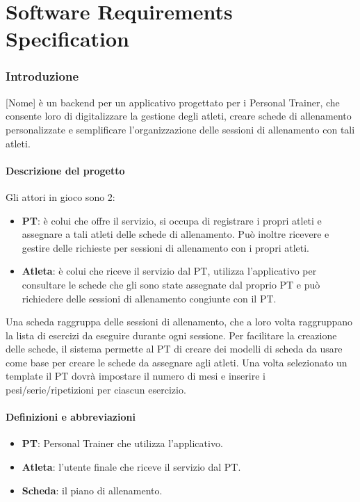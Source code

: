 \part{Software Requirements Specification}

\section{Introduzione}
[Nome] è un backend per un applicativo progettato per i Personal Trainer, che
consente loro di digitalizzare la gestione degli atleti, creare schede
di allenamento personalizzate e semplificare l'organizzazione delle
sessioni di allenamento con tali atleti.

\subsection{Descrizione del progetto}
Gli attori in gioco sono 2:
\begin{itemize}
  \item \textbf{PT}: è colui che offre il servizio, si occupa di
    registrare i propri atleti e assegnare a tali atleti delle schede
    di allenamento. Può inoltre ricevere e gestire delle richieste
    per sessioni di allenamento con i propri atleti.
  \item \textbf{Atleta}: è colui che riceve il servizio dal PT,
    utilizza l'applicativo per consultare le schede che gli sono
    state assegnate dal proprio PT e può richiedere delle sessioni di
    allenamento congiunte con il PT.
\end{itemize}
Una scheda raggruppa delle sessioni di allenamento, che a loro volta
raggruppano la lista di esercizi da eseguire durante ogni sessione.
Per facilitare la creazione delle schede, il sistema permette al PT
di creare dei modelli di scheda da usare come base per creare le
schede da assegnare agli atleti. Una volta selezionato un template il
PT dovrà impostare il numero di mesi e inserire i pesi/serie/ripetizioni
per ciascun esercizio.
\subsection{Definizioni e abbreviazioni}
\begin{itemize}
  \item \textbf{PT}: Personal Trainer che utilizza l'applicativo.
  \item \textbf{Atleta}: l'utente finale che riceve il servizio dal PT.
  \item \textbf{Scheda}: il piano di allenamento.
\end{itemize}

